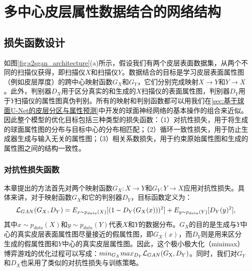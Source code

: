 \section{多中心皮层属性数据结合的网络结构}

\subsection{损失函数设计}
如图\ref{fig:s2sgan_architecture}(a)所示，假设我们有两个皮层表面数据集，从两个不同的扫描仪获得，即扫描仪$X$和扫描仪$Y$。数据结合的目标是学习皮层表面属性图（例如皮层厚度）的跨中心映射函数$G_X$和$G_Y$，它们分别完成映射$X\rightarrow Y$和$Y\rightarrow X$。此外，判别器$D_X$用于区分真实的和生成的$X$扫描仪的表面属性图，判别器$D_Y$用于$Y$扫描仪的属性图真伪判别。所有的映射和判别函数都可以用我们在\ref{sec:基于球面U-Net的皮层分区与属性预测}中开发的球面神经网络的基本操作的组合来近似。因此整个模型的优化目标包括三种类型的损失函数：（1）对抗性损失，用于将生成的球面属性图的分布与目标中心的分布相匹配；（2）循环一致性损失，用于防止生成器生成与输入无关的属性图；（3）相关系数损失，用于约束原始属性图和生成的属性图之间的结构一致性。
	
\subsubsection{对抗性损失函数}
本章提出的方法首先对两个映射函数$G_X:X\rightarrow Y$和$G_Y:Y\rightarrow X$应用对抗性损失。具体来讲，对于映射函数$G_X$和它的判别器$D_Y$，目标函数定义为：
\begin{equation}\label{eq:5-1}
	{{\cal L}_{GAN}}({G_X},{D_Y}) = {E_{x\sim{p_{data}}(X)}}[{(1 - {D_Y}({G_X}(x)))^{\rm{2}}}] + {E_{y\sim{p_{data}}(Y)}}[{D_Y}{(y)^2}],
\end{equation}
其中$x\sim p_{data}(X)$和$y\sim p_{data}(Y)$代表$X$和$Y$的数据分布。$G_X$的目的是生成与$Y$中心的真实皮层表面属性图尽量接近的假属性图，即$G_X(x)$，而$D_Y$则是用来区分生成的假属性图和$Y$中心的真实皮层属性图。因此，这个极小极大化（minimax）博弈游戏的优化过程可以写成：$mi{n_{{G_X}}}ma{x_{{D_Y}}}{{\cal L}_{GAN}}({G_{\rm{X}}},{D_Y})$。同时，我们对$G_Y$和$D_X$也采用了类似的对抗性损失与训练策略。

